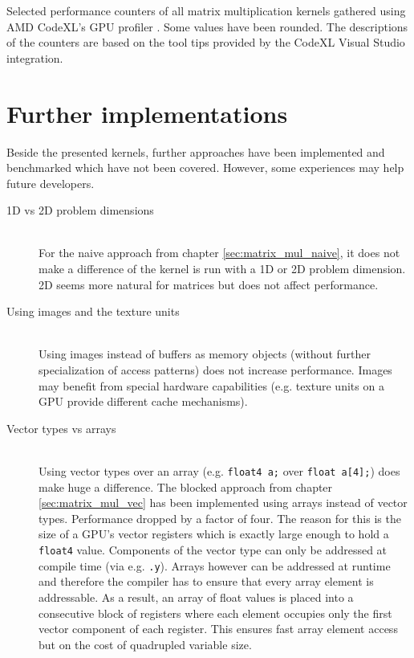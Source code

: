 \begin{table}
	\caption{Selected performance counters of all matrix multiplication kernels gathered using AMD CodeXL's GPU profiler \cite{amd_codexl}. Some values have been rounded. The descriptions of the counters are based on the tool tips provided by the CodeXL Visual Studio integration.}
	\label{tbl:matrix_perf_counter}
\end{table}

\section{Further implementations}
Beside the presented kernels, further approaches have been implemented and benchmarked which have not been covered. However, some experiences may help future developers.

\begin{description}
	\item[1D vs 2D problem dimensions] \hfill \\
	For the naive approach from chapter \ref{sec:matrix_mul_naive}, it does not make a difference of the kernel is run with a 1D or 2D problem dimension. 2D seems more natural for matrices but does not affect performance.
	\item[Using images and the texture units] \hfill \\
	Using images instead of buffers as memory objects (without further specialization of access patterns) does not increase performance. Images may benefit from special hardware capabilities (e.g. texture units on a GPU provide different cache mechanisms).
	\item[Vector types vs arrays] \hfill \\
	Using vector types over an array (e.g. \lstinline!float4 a;! over \lstinline!float a[4];!) does make huge a difference. The blocked approach from chapter \ref{sec:matrix_mul_vec} has been implemented using arrays instead of vector types. Performance dropped by a factor of four. The reason for this is the size of a GPU's vector registers which is exactly large enough to hold a \lstinline!float4! value. Components of the vector type can only be addressed at compile time (via e.g. \lstinline!.y!). Arrays however can be addressed at runtime and therefore the compiler has to ensure that every array element is addressable. As a result, an array of float values is placed into a consecutive block of registers where each element occupies only the first vector component of each register. This ensures fast array element access but on the cost of quadrupled variable size.
\end{description}

